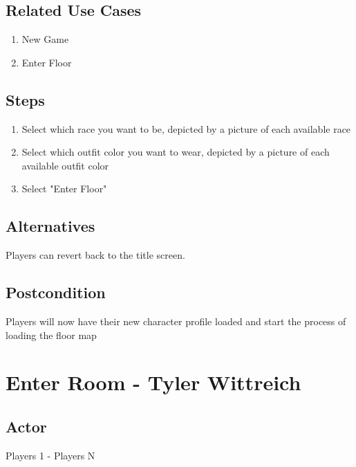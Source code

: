 \documentclass[10pt]{article}
\begin{document}
		\subsection{Related Use Cases}
			\begin{enumerate}
			      \item New Game
			      \item Enter Floor
			 \end{enumerate} 
	
        \subsection{Steps}
			\begin{enumerate}
			\item Select which race you want to be, depicted by a picture of each available race
			\item Select which outfit color you want to wear, depicted by a picture of each available outfit color
			\item Select "Enter Floor"
			\end{enumerate}
			
		\subsection{Alternatives}
			Players can revert back to the title screen.
			
		\subsection{Postcondition}
			Players will now have their new character profile loaded and start the process of loading the floor map 









\newpage










\section{Enter Room - Tyler Wittreich}

		\subsection{Actor}
		Players 1 - Players N
		
\end{document}
